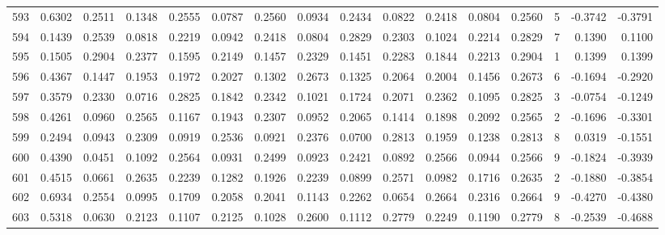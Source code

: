 \begin{tabular}{lrrrrrrrrrrrrrrr}
593 &      0.6302 &  0.2511 &  0.1348 &  0.2555 &  0.0787 &  0.2560 &  0.0934 &  0.2434 &  0.0822 &  0.2418 &   0.0804 &     0.2560 &      5 &                   -0.3742 &                    -0.3791 \\
594 &      0.1439 &  0.2539 &  0.0818 &  0.2219 &  0.0942 &  0.2418 &  0.0804 &  0.2829 &  0.2303 &  0.1024 &   0.2214 &     0.2829 &      7 &                    0.1390 &                     0.1100 \\
595 &      0.1505 &  0.2904 &  0.2377 &  0.1595 &  0.2149 &  0.1457 &  0.2329 &  0.1451 &  0.2283 &  0.1844 &   0.2213 &     0.2904 &      1 &                    0.1399 &                     0.1399 \\
596 &      0.4367 &  0.1447 &  0.1953 &  0.1972 &  0.2027 &  0.1302 &  0.2673 &  0.1325 &  0.2064 &  0.2004 &   0.1456 &     0.2673 &      6 &                   -0.1694 &                    -0.2920 \\
597 &      0.3579 &  0.2330 &  0.0716 &  0.2825 &  0.1842 &  0.2342 &  0.1021 &  0.1724 &  0.2071 &  0.2362 &   0.1095 &     0.2825 &      3 &                   -0.0754 &                    -0.1249 \\
598 &      0.4261 &  0.0960 &  0.2565 &  0.1167 &  0.1943 &  0.2307 &  0.0952 &  0.2065 &  0.1414 &  0.1898 &   0.2092 &     0.2565 &      2 &                   -0.1696 &                    -0.3301 \\
599 &      0.2494 &  0.0943 &  0.2309 &  0.0919 &  0.2536 &  0.0921 &  0.2376 &  0.0700 &  0.2813 &  0.1959 &   0.1238 &     0.2813 &      8 &                    0.0319 &                    -0.1551 \\
600 &      0.4390 &  0.0451 &  0.1092 &  0.2564 &  0.0931 &  0.2499 &  0.0923 &  0.2421 &  0.0892 &  0.2566 &   0.0944 &     0.2566 &      9 &                   -0.1824 &                    -0.3939 \\
601 &      0.4515 &  0.0661 &  0.2635 &  0.2239 &  0.1282 &  0.1926 &  0.2239 &  0.0899 &  0.2571 &  0.0982 &   0.1716 &     0.2635 &      2 &                   -0.1880 &                    -0.3854 \\
602 &      0.6934 &  0.2554 &  0.0995 &  0.1709 &  0.2058 &  0.2041 &  0.1143 &  0.2262 &  0.0654 &  0.2664 &   0.2316 &     0.2664 &      9 &                   -0.4270 &                    -0.4380 \\
603 &      0.5318 &  0.0630 &  0.2123 &  0.1107 &  0.2125 &  0.1028 &  0.2600 &  0.1112 &  0.2779 &  0.2249 &   0.1190 &     0.2779 &      8 &                   -0.2539 &                    -0.4688 \\

\end{tabular}
